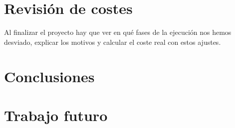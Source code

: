 
\section{Revisión de costes}

Al finalizar el proyecto hay que ver en qué fases de la ejecución nos
hemos desviado, explicar los motivos y calcular el coste real con
estos ajustes.

\section{Conclusiones}

\section{Trabajo futuro}
